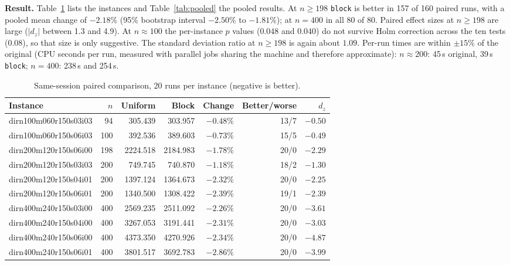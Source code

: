 \textbf{Result.} Table~\ref{tab:paired} lists the instances and Table~\ref{tab:pooled} the pooled results. At $n\ge198$ \texttt{block} is better in 157 of 160 paired runs, with a pooled mean change of $-2.18\%$ (95\% bootstrap interval $-2.50\%$ to $-1.81\%$); at $n=400$ in all 80 of 80. Paired effect sizes at $n\ge198$ are large ($|d_z|$ between 1.3 and 4.9). At $n\approx100$ the per-instance $p$ values ($0.048$ and $0.040$) do not survive Holm correction across the ten tests ($0.08$), so that size is only suggestive. The standard deviation ratio at $n\ge198$ is again about $1.09$. Per-run times are within $\pm15\%$ of the original (CPU seconds per run, measured with parallel jobs sharing the machine and therefore approximate): $n\approx200$: 45\,s original, 39\,s \texttt{block}; $n=400$: 238\,s and 254\,s.

\begin{table}[htbp]
\centering
\caption{Same-session paired comparison, 20 runs per instance (negative is better).}
\label{tab:paired}
\small
\begin{tabular}{lrrrrrr}
\toprule
\textbf{Instance} & $n$ & \textbf{Uniform} & \textbf{Block} & \textbf{Change} & \textbf{Better/worse} & $d_z$\\
\midrule
dirn100m060r150s03i03 & 94 & 305.439 & 303.957 & $-0.48\%$ & 13/7 & $-0.50$\\
dirn100m060r150s06i03 & 100 & 392.536 & 389.603 & $-0.73\%$ & 15/5 & $-0.49$\\
dirn200m120r150s06i00 & 198 & 2224.518 & 2184.983 & $-1.78\%$ & 20/0 & $-2.29$\\
dirn200m120r150s03i03 & 200 & 749.745 & 740.870 & $-1.18\%$ & 18/2 & $-1.30$\\
dirn200m120r150s04i01 & 200 & 1397.124 & 1364.673 & $-2.32\%$ & 20/0 & $-2.25$\\
dirn200m120r150s06i01 & 200 & 1340.500 & 1308.422 & $-2.39\%$ & 19/1 & $-2.39$\\
dirn400m240r150s03i00 & 400 & 2569.235 & 2511.092 & $-2.26\%$ & 20/0 & $-3.61$\\
dirn400m240r150s04i00 & 400 & 3267.053 & 3191.441 & $-2.31\%$ & 20/0 & $-3.03$\\
dirn400m240r150s06i00 & 400 & 4373.350 & 4270.926 & $-2.34\%$ & 20/0 & $-4.87$\\
dirn400m240r150s06i01 & 400 & 3801.517 & 3692.783 & $-2.86\%$ & 20/0 & $-3.99$\\
\bottomrule
\end{tabular}
\end{table}

